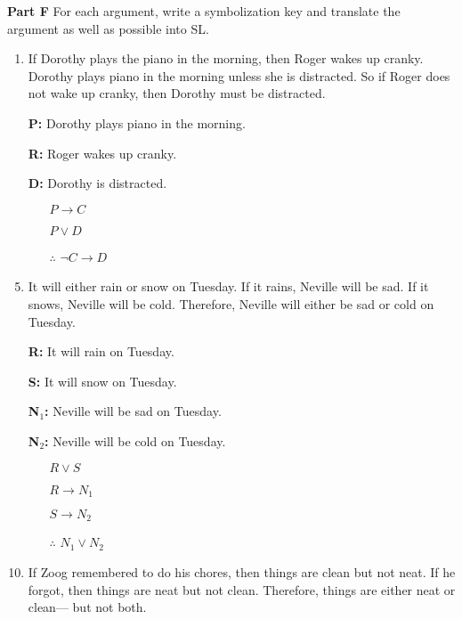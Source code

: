 \documentclass[12pt, letterpaper, twoside]{article}
\begin{document}
\noindent \textbf{Part F} For each argument, write a
symbolization key and translate the argument as well as
possible into SL.
\begin{enumerate}
	\item If Dorothy plays the piano in the morning,
          then Roger wakes up cranky. Dorothy plays piano in
          the morning unless she is distracted. So if Roger
          does not wake up cranky, then Dorothy must be
          distracted.

	\item[\textbf{P:}] Dorothy plays piano in the
          morning.
	\item[\textbf{R:}] Roger wakes up cranky.
	\item[\textbf{D:}] Dorothy is distracted.

    \begin{enumerate}
        \item[] $P \rightarrow C$
        \item[] $P \vee D$
        \item[$\therefore$] $\neg C \rightarrow D$
    \end{enumerate}

	\item It will either rain or snow on Tuesday. If it
          rains, Neville will be sad. If it snows, Neville
          will be cold. Therefore, Neville will either be
          sad or cold on Tuesday.

	\item[\textbf{R:}] It will rain on Tuesday.
	\item[\textbf{S:}] It will snow on Tuesday.
	\item[\textbf{N$_1$:}] Neville will be sad on
          Tuesday.
	\item[\textbf{N$_2$:}] Neville will be cold on
          Tuesday.
	
    \begin{enumerate}
        \item[] $R \vee S$
        \item[] $R \rightarrow N_1$
        \item[] $S \rightarrow N_2$
        \item[$\therefore$] $N_1 \vee N_2$
    \end{enumerate}

	\item If Zoog remembered to do his chores, then
          things are clean but not neat. If he forgot, then
          things are neat but not clean. Therefore, things
          are either neat or clean--- but not both.


\end{enumerate}
\end{document}
